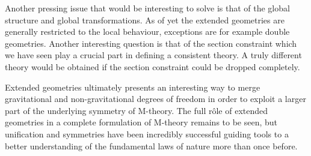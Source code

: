 Another pressing issue that would be interesting to solve is that of the global structure and global transformations. As of yet the extended geometries are generally restricted to the local behaviour, exceptions are for example double geometries. Another interesting question is that of the section constraint which we have seen play a crucial part in defining a consistent theory. A truly different theory would be obtained if the section constraint could be dropped completely. 

Extended geometries ultimately presents an interesting way to merge gravitational and non-gravitational degrees of freedom in order to exploit a larger part of the underlying symmetry of M-theory. The full rôle of extended geometries in a complete formulation of M-theory remains to be seen, but unification and symmetries have been incredibly successful guiding tools to a better understanding of the fundamental laws of nature more than once before. 
